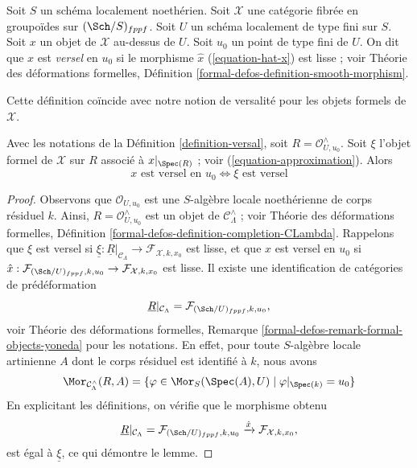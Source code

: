 \begin{definition}
\label{definition-versal}
Soit $S$ un schéma localement noethérien.
Soit $\mathcal{X}$ une catégorie fibrée en groupoïdes sur $(\Sch/S)_{fppf}$.
Soit $U$ un schéma localement de type fini sur $S$.
Soit $x$ un objet de $\mathcal{X}$ au-dessus de $U$.
Soit $u_0$ un point de type fini de $U$.
On dit que $x$ est {\it versel} en $u_0$ si le morphisme $\hat x$
(\ref{equation-hat-x}) est lisse ; voir Théorie des déformations formelles, Définition
\ref{formal-defos-definition-smooth-morphism}.
\end{definition}

\noindent
Cette définition coïncide avec notre notion de versalité pour les objets formels de
$\mathcal{X}$.

\begin{lemma}
\label{lemma-versality-matches}
Avec les notations de la Définition \ref{definition-versal},
soit $R = \mathcal{O}_{U, u_0}^\wedge$.
Soit $\xi$ l'objet formel de $\mathcal{X}$
sur $R$ associé à $x|_{\Spec(R)}$ ; voir (\ref{equation-approximation}).
Alors
$$
x\text{ est versel en }u_0
\Leftrightarrow
\xi\text{ est versel}
$$
\end{lemma}

\begin{proof}
Observons que $\mathcal{O}_{U, u_0}$ est une $S$-algèbre locale noethérienne
de corps résiduel $k$. Ainsi, $R = \mathcal{O}_{U, u_0}^\wedge$ est un objet de
$\mathcal{C}_\Lambda^\wedge$ ; voir Théorie des déformations formelles, Définition
\ref{formal-defos-definition-completion-CLambda}.
Rappelons que $\xi$ est versel si
$\underline{\xi} : \underline{R}|_{\mathcal{C}_\Lambda} \to
\mathcal{F}_{\mathcal{X}, k, x_0}$
est lisse, et que $x$ est versel en $u_0$ si
$\hat x : \mathcal{F}_{(\Sch/U)_{fppf}, k, u_0}
\to \mathcal{F}_{\mathcal{X}, k, x_0}$ est lisse.
Il existe une identification de catégories de prédéformation
$$
\underline{R}|_{\mathcal{C}_\Lambda}
=
\mathcal{F}_{(\Sch/U)_{fppf}, k, u_0},
$$
voir Théorie des déformations formelles, Remarque
\ref{formal-defos-remark-formal-objects-yoneda} pour les notations.
En effet, pour toute $S$-algèbre locale artinienne $A$ dont le corps résiduel
est identifié à $k$, nous avons
$$
\Mor_{\mathcal{C}_\Lambda^\wedge}(R, A) =
\{\varphi \in \Mor_S(\Spec(A), U) \mid \varphi|_{\Spec(k)} = u_0\}
$$
En explicitant les définitions, on vérifie que le morphisme obtenu
$$
\underline{R}|_{\mathcal{C}_\Lambda} =
\mathcal{F}_{(\Sch/U)_{fppf}, k, u_0}
\xrightarrow{\hat x}
\mathcal{F}_{\mathcal{X}, k, x_0},
$$
est égal à $\underline{\xi}$, ce qui démontre le lemme.
\end{proof}


